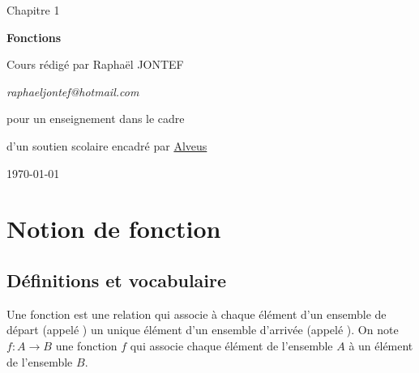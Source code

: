 

\newcommand{\titrechapitre}{Fonctions}
\newcommand{\numerochapitre}{1}

\renewcommand{\headrulewidth}{0.4pt}
\renewcommand{\footrulewidth}{0.4pt}
\fancyfoot[C]{\thepage}
\fancyhead[R]{\titrechapitre}




\setlength{\headheight}{15pt}
\begin{titlepage}
    \centering
    \vspace*{3cm}
    {\huge Chapitre \numerochapitre\par}
    {\Huge \bfseries\titrechapitre\par}
    \vspace{8cm}
    {\Large Cours rédigé par Raphaël JONTEF\par}
    \vspace{2em}
    {\small \textit{raphaeljontef@hotmail.com}\par}
    \vspace{2cm}

    {\normalsize pour un enseignement dans le cadre  \par}
    {\small d'un soutien scolaire encadré par \href{https://www.alveusclub.com/}{Alveus} \par}
    \vfill
    {\large \today\par}
\end{titlepage}

\tableofcontents
\newpage



\section{Notion de fonction}
\subsection{Définitions et vocabulaire}
Une fonction est une relation qui associe à chaque élément d'un ensemble de départ (appelé ) un unique élément d'un ensemble d'arrivée (appelé ). On note $f : A \to B$ une fonction \(f\) qui associe chaque élément de l'ensemble \(A\) à un élément de l'ensemble \(B\).

